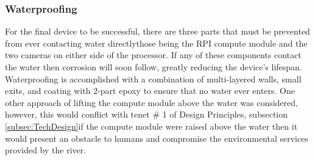 \documentclass[fleqn,10pt]{SelfArx} %
\begin{document}

	
	\subsubsection{Waterproofing}
	For the final device to be successful, there are three parts that must be prevented from ever contacting water directly\textemdash those being the \gls{RPI} compute module and the two cameras on either side of the processor. If any of these components contact the water then corrosion will soon follow, greatly reducing the device’s lifespan. Waterproofing is accomplished with a combination of multi-layered walls, small exits, and coating with 2-part epoxy to ensure that no water ever enters. One other approach of lifting the compute module above the water was considered, however, this would conflict with tenet \# 1 of Design Principles, subsection \ref{subsec:TechDesign}\textemdash if the compute module were raised above the water then it would present an obstacle to humans and compromise the environmental services provided by the river. 
\end{document}
